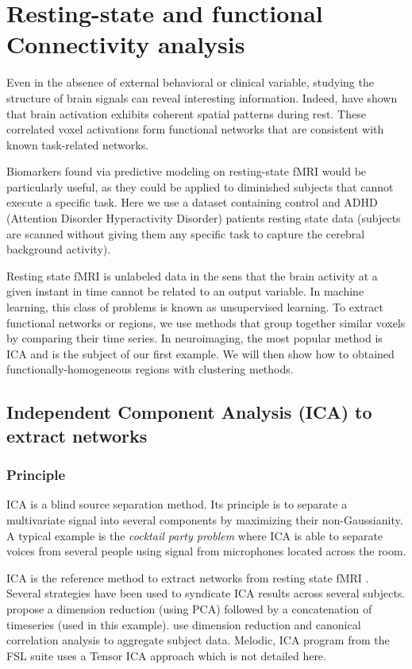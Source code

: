 \documentclass{frontiersSCNS} %
\begin{document}
\section{Resting-state and functional Connectivity analysis}

Even in the absence of external behavioral or clinical variable, studying
the structure of brain signals can reveal interesting information.
Indeed, \cite{biswal1995} have shown that brain activation exhibits
coherent spatial patterns during rest. These correlated voxel activations
form functional networks that are consistent with known task-related networks.

Biomarkers found via predictive modeling on resting-state fMRI would be
particularly useful, as they could be applied to diminished subjects that
cannot execute a specific task. Here we use a dataset containing control
and ADHD (Attention Disorder Hyperactivity Disorder) patients resting
state data (subjects are scanned without giving them any specific task to
capture the cerebral background activity).

Resting state fMRI is unlabeled data in the sens that the brain activity
at a given instant in time cannot be related to an output variable.
In machine learning, this class of problems is known as unsupervised
learning. 
To extract functional networks or regions, we use methods that group together 
similar voxels by comparing their time
series. In neuroimaging, the most popular method is ICA and
is the subject of our first example. We will then show how to obtained 
functionally-homogeneous regions with
clustering methods.

\subsection{Independent Component Analysis (ICA) to extract networks}

\subsubsection{Principle}

ICA is a blind source separation method. Its principle is to separate a
multivariate signal into several components by maximizing their non-Gaussianity.
A typical example is the \emph{cocktail party problem} where ICA is able to separate
voices from several people using signal from microphones located across the room.

ICA is the reference method to extract networks from resting state
fMRI \citep{kiviniemi2003}. Several strategies have been used to syndicate ICA
results across several subjects. \cite{calhoun2001a} propose a dimension
reduction (using PCA) followed by a concatenation of timeseries (used in this
example). \cite{varoquaux2010} use dimension reduction and canonical correlation analysis
to aggregate subject data. Melodic, ICA program from the FSL suite uses a Tensor
ICA approach which is not detailed here.
\end{document}
